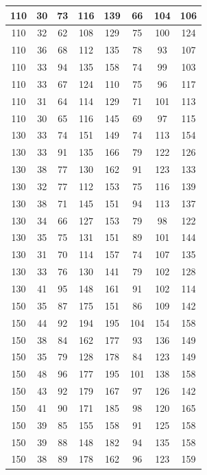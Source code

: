 \begin{longtable}[c]{|c|c|c|c|c|c|c|c|}
110 & 30 & 73 & 116 & 139 & 66  & 104 & 106 \\ \hline
110 & 32 & 62 & 108 & 129 & 75  & 100 & 124 \\ \hline
110 & 36 & 68 & 112 & 135 & 78  & 93  & 107 \\ \hline
110 & 33 & 94 & 135 & 158 & 74  & 99  & 103 \\ \hline
110 & 33 & 67 & 124 & 110 & 75  & 96  & 117 \\ \hline
110 & 31 & 64 & 114 & 129 & 71  & 101 & 113 \\ \hline
110 & 30 & 65 & 116 & 145 & 69  & 97  & 115 \\ \hline
130 & 33 & 74 & 151 & 149 & 74  & 113 & 154 \\ \hline
130 & 33 & 91 & 135 & 166 & 79  & 122 & 126 \\ \hline
130 & 38 & 77 & 130 & 162 & 91  & 123 & 133 \\ \hline
130 & 32 & 77 & 112 & 153 & 75  & 116 & 139 \\ \hline
130 & 38 & 71 & 145 & 151 & 94  & 113 & 137 \\ \hline
130 & 34 & 66 & 127 & 153 & 79  & 98  & 122 \\ \hline
130 & 35 & 75 & 131 & 151 & 89  & 101 & 144 \\ \hline
130 & 31 & 70 & 114 & 157 & 74  & 107 & 135 \\ \hline
130 & 33 & 76 & 130 & 141 & 79  & 102 & 128 \\ \hline
130 & 41 & 95 & 148 & 161 & 91  & 102 & 114 \\ \hline
150 & 35 & 87 & 175 & 151 & 86  & 109 & 142 \\ \hline
150 & 44 & 92 & 194 & 195 & 104 & 154 & 158 \\ \hline
150 & 38 & 84 & 162 & 177 & 93  & 136 & 149 \\ \hline
150 & 35 & 79 & 128 & 178 & 84  & 123 & 149 \\ \hline
150 & 48 & 96 & 177 & 195 & 101 & 138 & 158 \\ \hline
150 & 43 & 92 & 179 & 167 & 97  & 126 & 142 \\ \hline
150 & 41 & 90 & 171 & 185 & 98  & 120 & 165 \\ \hline
150 & 39 & 85 & 155 & 158 & 91  & 125 & 158 \\ \hline
150 & 39 & 88 & 148 & 182 & 94  & 135 & 158 \\ \hline
150 & 38 & 89 & 178 & 162 & 96  & 123 & 159 \\ \hline
\end{longtable}

